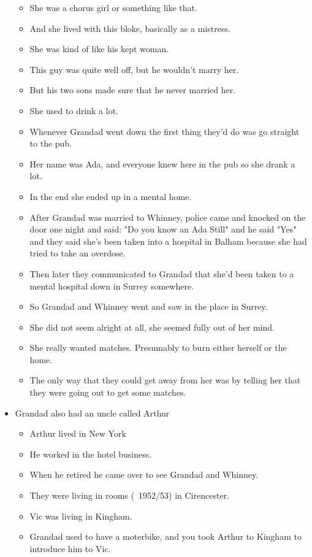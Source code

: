 \documentclass[10pt,twocolumn,letterpaper]{article}
\begin{document}
\begin{itemize}
\begin{itemize}
              \item She was a chorus girl or something like that.
              \item And she lived with this bloke, basically as a mistress.
              \item She was kind of like his kept woman.
              \item This guy was quite well off, but he wouldn't marry her.
              \item But his two sons made sure that he never married her.
              \item She used to drink a lot.
              \item Whenever Grandad went down the first thing they'd do was go straight to the pub.
              \item Her name was Ada, and everyone knew here in the pub so she drank a lot.
              \item In the end she ended up in a mental home.
              \item After Grandad was married to Whinney, police came and knocked on the door one night and said: "Do you know an Ada Still" and he said "Yes" and they said she's been taken into a hospital in Balham because she had tried to take an overdose.
              \item Then later they communicated to Grandad that she'd been taken to a mental hospital down in Surrey somewhere.
              \item So Grandad and Whinney went and saw in the place in Surrey.
              \item She did not seem alright at all, she seemed fully out of her mind.
              \item She really wanted matches. Presumably to burn either herself or the home.
              \item The only way that they could get away from her was by telling her that they were going out to get some matches.
          \end{itemize}
    \item Grandad also had an uncle called Arthur
          \begin{itemize}
              \item Arthur lived in New York
              \item He worked in the hotel business.
              \item When he retired he came over to see Grandad and Whinney.
              \item They were living in rooms (~1952/53) in Cirencester.
              \item Vic was living in Kingham.
              \item Grandad used to have a moterbike, and you took Arthur to Kingham to introduce him to Vic.
          \end{itemize}
\end{itemize}
\end{document}
